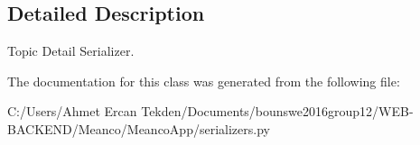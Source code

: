 \subsection{Detailed Description}
Topic Detail Serializer. 

The documentation for this class was generated from the following file\+:\begin{DoxyCompactItemize}
\item 
C\+:/\+Users/\+Ahmet Ercan Tekden/\+Documents/bounswe2016group12/\+W\+E\+B-\/\+B\+A\+C\+K\+E\+N\+D/\+Meanco/\+Meanco\+App/serializers.\+py\end{DoxyCompactItemize}
